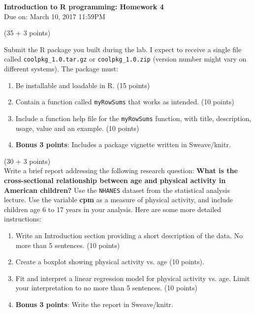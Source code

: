 \documentclass[11pt]{article}
\begin{document}
\begin{center}
{\Large \bf Introduction to R programming: Homework 4}\\
Due on: March 10, 2017  11:59PM
\end{center}

\vspace{0.2in}
 (35 + 3 points) 

\noindent Submit the R package you built during the lab. I expect to receive 
a single file called {\tt coolpkg\_1.0.tar.gz} or {\tt coolpkg\_1.0.zip} (version number might vary on different systems). 
The package must:
\begin{enumerate}
\item Be installable and loadable in R. (15 points)
\item Contain a function called {\tt myRowSums} that works as intended. (10 points)
\item Include a function help file for the {\tt myRowSums} function, with title,
description, usage, value and an example. (10 points)
\item  {\bf Bonus 3 points}: Includes a package vignette written in Sweave/knitr.
\end{enumerate}


\vspace{0.2in}
 (30 + 3 points) \\
Write a brief report addressing the following research question: \textbf{What is the cross-sectional relationship between age and physical activity in American children?} Use the {\tt NHANES} dataset from the statistical analysis lecture. Use the variable \textbf{cpm} as a measure of physical activity, and include children age 6 to 17 years in your analysis. Here are some more detailed instructions:

\begin{enumerate}
\item Write an Introduction section providing a short description of the data. No more than 5 sentences. (10 points) 
\item Create a boxplot showing physical activity vs. age (10 points).
\item Fit and interpret a linear regression model for physical activity vs. age. Limit your interpretation to no more than 5 sentences. (10 points)
\item {\bf Bonus 3 points}: Write the report in Sweave/knitr. 
\end{enumerate}
\end{document}
